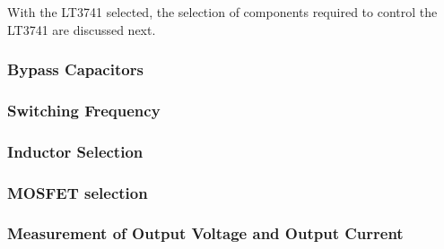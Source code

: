 With the LT3741 selected, the selection of  components  required  to control the
LT3741 are discussed next.

\subsubsection{Bypass Capacitors}



\subsubsection{Switching Frequency}



\subsubsection{Inductor Selection}



\subsubsection{MOSFET selection}



\subsubsection{Measurement of Output Voltage and Output Current}



